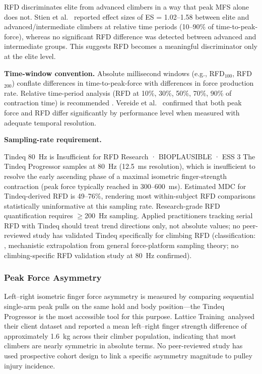 RFD discriminates elite from advanced climbers in a way that peak MFS alone does not. Stien et al.\ \cite{SVS+21} reported effect sizes of ES = 1.02--1.58 between elite and advanced/intermediate climbers at relative time periods (10--90\% of time-to-peak-force), whereas no significant RFD difference was detected between advanced and intermediate groups. This suggests RFD becomes a meaningful discriminator only at the elite level.

\medskip
\noindent\textbf{Time-window convention.} Absolute millisecond windows (e.g., RFD$_{100}$, RFD$_{200}$) conflate differences in time-to-peak-force with differences in force production rate. Relative time-period analysis (RFD at 10\%, 30\%, 50\%, 70\%, 90\% of contraction time) is recommended \cite{SVS+21}. Vereide et al.\ \cite{VAH+22} confirmed that both peak force and RFD differ significantly by performance level when measured with adequate temporal resolution.

\medskip
\noindent\textbf{Sampling-rate requirement.}

\begin{bioplausbox}{Tindeq 80~Hz is Insufficient for RFD Research · BIOPLAUSIBLE · ESS 3}
The Tindeq Progressor samples at 80~Hz (12.5~ms resolution), which is insufficient to resolve the early ascending phase of a maximal isometric finger-strength contraction (peak force typically reached in 300--600~ms). Estimated MDC for Tindeq-derived RFD is 49--76\%, rendering most within-subject RFD comparisons statistically uninformative at this sampling rate. Research-grade RFD quantification requires $\geq$200~Hz sampling. Applied practitioners tracking serial RFD with Tindeq should treat trend directions only, not absolute values; no peer-reviewed study has validated Tindeq specifically for climbing RFD (classification: \bioplausible, mechanistic extrapolation from general force-platform sampling theory; no climbing-specific RFD validation study at 80~Hz confirmed).
\end{bioplausbox}

\subsubsection{Peak Force Asymmetry}

Left--right isometric finger force asymmetry is measured by comparing sequential single-arm peak pulls on the same hold and body position---the Tindeq Progressor is the most accessible tool for this purpose.
Lattice Training\singlesource\ analysed their client dataset and reported a mean left--right finger strength difference of approximately 1.6~kg across their climber population, indicating that most climbers are nearly symmetric in absolute terms.
No peer-reviewed study has used prospective cohort design to link a specific asymmetry magnitude to pulley injury incidence.


